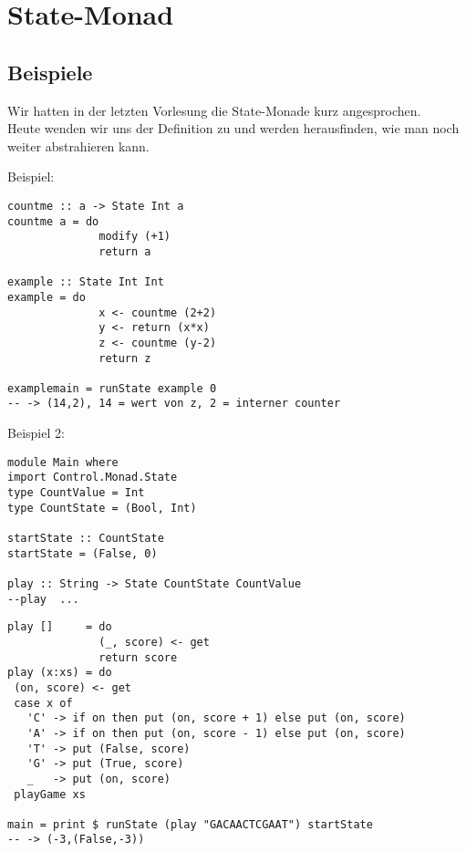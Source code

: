 \documentclass{beamer}
\begin{document}
\section{State-Monad}

\subsection{Beispiele}
\begin{frame}[fragile]
Wir hatten in der letzten Vorlesung die State-Monade kurz angesprochen.\\
Heute wenden wir uns der Definition zu und werden herausfinden, wie man noch weiter abstrahieren kann.\\
\end{frame}

\begin{frame}[fragile]
Beispiel:
\begin{verbatim}
countme :: a -> State Int a
countme a = do
              modify (+1)
              return a

example :: State Int Int
example = do
              x <- countme (2+2)
              y <- return (x*x)
              z <- countme (y-2)
              return z

examplemain = runState example 0
-- -> (14,2), 14 = wert von z, 2 = interner counter
\end{verbatim}
\end{frame}

\begin{frame}[fragile]
Beispiel 2:
\begin{verbatim}
module Main where
import Control.Monad.State
type CountValue = Int
type CountState = (Bool, Int)
 
startState :: CountState
startState = (False, 0)

play :: String -> State CountState CountValue
--play  ...

\end{verbatim}
\end{frame}

\begin{frame}[fragile]
\begin{verbatim}
play []     = do
              (_, score) <- get
              return score
play (x:xs) = do
 (on, score) <- get
 case x of
   'C' -> if on then put (on, score + 1) else put (on, score)
   'A' -> if on then put (on, score - 1) else put (on, score)
   'T' -> put (False, score)
   'G' -> put (True, score)
   _   -> put (on, score)
 playGame xs

main = print $ runState (play "GACAACTCGAAT") startState
-- -> (-3,(False,-3))
\end{verbatim}
\end{frame}
\end{document}
